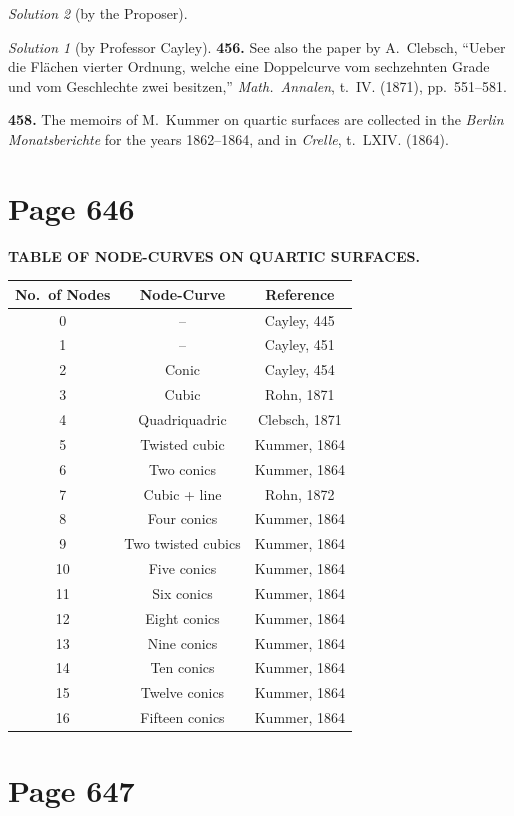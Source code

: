 \documentclass[12pt,a4paper]{article}
\theoremstyle{plain}
\theoremstyle{definition}
\theoremstyle{remark}
\newtheorem*{solution}{Solution}
\begin{document}
\begin{solution}[by the Proposer]
\begin{solution}[by Professor Cayley]
\noindent\textbf{456.} See also the paper by A.~Clebsch, ``Ueber die Fl\"{a}chen vierter Ordnung, welche eine Doppelcurve vom sechzehnten Grade und vom Geschlechte zwei besitzen,'' \textit{Math.~Annalen}, t.~IV. (1871), pp.~551--581.

\noindent\textbf{458.} The memoirs of M.~Kummer on quartic surfaces are collected in the \textit{Berlin Monatsberichte} for the years 1862--1864, and in \textit{Crelle}, t.~LXIV. (1864).

\section*{Page 646}
\setcounter{page}{646}

\begin{center}
\textbf{TABLE OF NODE-CURVES ON QUARTIC SURFACES.}
\end{center}

\begin{center}
\begin{tabular}{|c|c|c|}
\hline
\textbf{No.~of Nodes} & \textbf{Node-Curve} & \textbf{Reference} \\
\hline
0 & -- & Cayley, 445 \\
1 & -- & Cayley, 451 \\
2 & Conic & Cayley, 454 \\
3 & Cubic & Rohn, 1871 \\
4 & Quadriquadric & Clebsch, 1871 \\
5 & Twisted cubic & Kummer, 1864 \\
6 & Two conics & Kummer, 1864 \\
7 & Cubic + line & Rohn, 1872 \\
8 & Four conics & Kummer, 1864 \\
9 & Two twisted cubics & Kummer, 1864 \\
10 & Five conics & Kummer, 1864 \\
11 & Six conics & Kummer, 1864 \\
12 & Eight conics & Kummer, 1864 \\
13 & Nine conics & Kummer, 1864 \\
14 & Ten conics & Kummer, 1864 \\
15 & Twelve conics & Kummer, 1864 \\
16 & Fifteen conics & Kummer, 1864 \\
\hline
\end{tabular}
\end{center}

\section*{Page 647}
\setcounter{page}{647}


\end{solution}
\end{solution}
\end{document}
